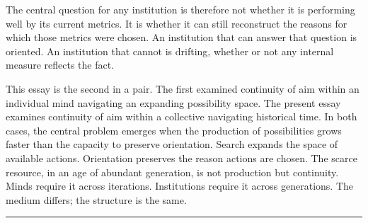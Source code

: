 The central question for any institution is therefore not whether it is
performing well by its current metrics. It is whether it can still reconstruct
the reasons for which those metrics were chosen. An institution that can
answer that question is oriented. An institution that cannot is drifting,
whether or not any internal measure reflects the fact.

\bigskip

This essay is the second in a pair. The first examined continuity of aim
within an individual mind navigating an expanding possibility space. The
present essay examines continuity of aim within a collective navigating
historical time. In both cases, the central problem emerges when the
production of possibilities grows faster than the capacity to preserve
orientation. Search expands the space of available actions. Orientation
preserves the reason actions are chosen. The scarce resource, in an age
of abundant generation, is not production but continuity. Minds require
it across iterations. Institutions require it across generations. The
medium differs; the structure is the same.

\bigskip
\begin{center}
  \rule{0.4\textwidth}{0.4pt}
\end{center}

